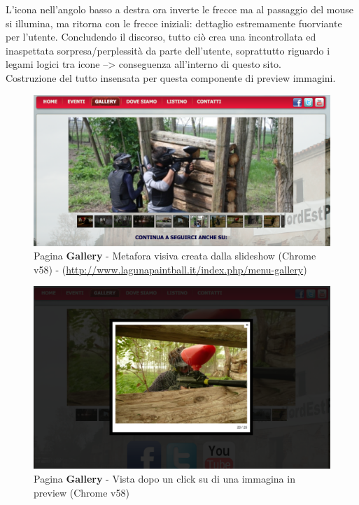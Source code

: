 \documentclass[../Relazione.tex]{subfiles}
\begin{document}
		L'icona nell'angolo basso a destra ora inverte le frecce ma al passaggio del mouse si illumina, ma ritorna con le frecce iniziali: dettaglio estremamente fuorviante per l'utente.
		Concludendo il discorso, tutto ciò crea una incontrollata ed inaspettata sorpresa/perplessità da parte dell'utente, soprattutto riguardo i legami logici tra icone --> conseguenza all'interno di questo sito.\\
		Costruzione del tutto insensata per questa componente di preview immagini.
			
\newpage
		\begin{figure}[!h]
			\centering
			\includegraphics[width=\textwidth]{img/contenuto/gallery.png}
			\caption{Pagina \textbf{Gallery} - Metafora visiva creata dalla slideshow (Chrome v58) - (\url{http://www.lagunapaintball.it/index.php/menu-gallery})}
			\label{fig:gallery}
		\end{figure}

		\begin{figure}[!h]
			\centering
			\includegraphics[width=\textwidth]{img/contenuto/galleryClick.png}
			\caption{Pagina \textbf{Gallery} - Vista dopo un click su di una immagina in preview (Chrome v58)}
			\label{fig:galleryClick}
		\end{figure}
\end{document}
